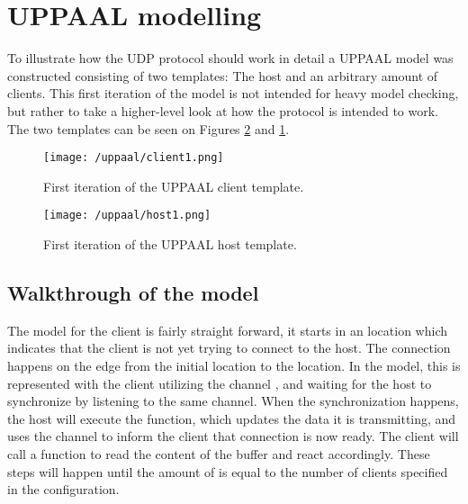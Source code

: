 \section{UPPAAL modelling}\label{sec:sprint3-uppaal}
To illustrate how the UDP protocol should work in detail a UPPAAL model was constructed consisting of two templates: The host and an arbitrary amount of clients.
This first iteration of the model is not intended for heavy model checking, but rather to take a higher-level look at how the protocol is intended to work.
The two templates can be seen on Figures \ref{fig:uppaal-host-1} and \ref{fig:uppaal-client-1}.

\begin{figure}[H]
   \centering
    \texttt{[image: /uppaal/client1.png]}
    \caption{First iteration of the UPPAAL client template.}
    \label{fig:uppaal-client-1}
\end{figure}

\begin{figure}[H]
   \centering
    \texttt{[image: /uppaal/host1.png]}
    \caption{First iteration of the UPPAAL host template.}
    \label{fig:uppaal-host-1}
\end{figure}

\subsection{Walkthrough of the model}
The model for the client is fairly straight forward, it starts in an  location which indicates that the client is not yet trying to connect to the host.
The connection happens on the edge from the initial location to the  location.
In the model, this is represented with the client utilizing the channel , and waiting for the host to synchronize by listening to the same channel.
When the synchronization happens, the host will execute the  function, which updates the data it is transmitting, and uses the channel  to inform the client that connection is now ready.
The client will call a function  to read the content of the buffer and react accordingly. 
These steps will happen until the amount of  is equal to the number of clients specified in the configuration.

